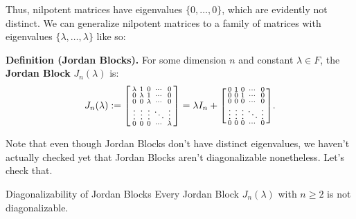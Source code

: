 Thus, nilpotent matrices have eigenvalues $\{0, \dots, 0\}$, which are evidently not distinct.  We can generalize nilpotent matrices to a family of matrices with eigenvalues $\{\lambda, \dots, \lambda\}$ like so:

\textbf{Definition (Jordan Blocks).} For some dimension $n$ and constant $\lambda \in F$, the \textbf{Jordan Block} $J_n(\lambda)$ is:
\[ J_n(\lambda) := \begin{bsmallmatrix} \lambda & 1 & 0 & \cdots & 0 \\ 0 & \lambda & 1 & \cdots &  0 \\ 0 & 0 & \lambda & \cdots & 0 \\ \vdots & \vdots & \vdots & \ddots & \vdots \\ 0 & 0 & 0 & \cdots & \lambda\end{bsmallmatrix} = \lambda I_n + \begin{bsmallmatrix} 0 & 1 & 0 & \cdots & 0 \\ 0 & 0 & 1 & \cdots & 0 \\ 0 & 0 & 0 & \cdots & 0 \\ \vdots & \vdots & \vdots & \ddots & \vdots \\ 0 & 0 & 0 & \cdots & 0 \end{bsmallmatrix}. \]

Note that even though Jordan Blocks don't have distinct eigenvalues, we haven't actually checked yet that Jordan Blocks aren't diagonalizable nonetheless.  Let's check that.

\begin{theorem}{Diagonalizability of Jordan Blocks}
    Every Jordan Block $J_n(\lambda)$ with $n \geq 2$ is not diagonalizable.
\end{theorem}

